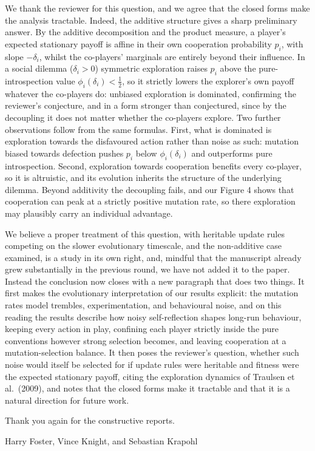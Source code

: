 \documentclass[11pt]{article}
\begin{document}
We thank the reviewer for this question, and we agree that the closed
forms make the analysis tractable. Indeed, the additive structure gives a
sharp preliminary answer. By the additive decomposition and the product
measure, a player's expected stationary payoff is affine in their own
cooperation probability \(p_i\), with slope \(-\delta_i\), whilst the
co-players' marginals are entirely beyond their influence. In a social
dilemma (\(\delta_i>0\)) symmetric exploration raises \(p_i\) above the
pure-introspection value \(\phi_i(\delta_i)<\tfrac{1}{2}\), so it
strictly lowers the explorer's own payoff whatever the co-players do:
unbiased exploration is dominated, confirming the reviewer's conjecture,
and in a form stronger than conjectured, since by the decoupling it does
not matter whether the co-players explore. Two further observations
follow from
the same formulas. First, what is dominated is exploration towards the
disfavoured action rather than noise as such: mutation biased towards
defection pushes \(p_i\) below \(\phi_i(\delta_i)\) and outperforms pure
introspection. Second, exploration towards cooperation benefits every
co-player, so it is altruistic, and its evolution inherits the structure
of the underlying dilemma. Beyond additivity the decoupling fails, and
our Figure 4 shows that cooperation can peak at a strictly positive
mutation rate, so there exploration may plausibly carry an individual
advantage.

We believe a proper treatment of this question, with heritable update
rules competing on the slower evolutionary timescale, and the
non-additive case examined, is a study in its own right, and, mindful
that the manuscript already grew substantially in the previous round, we
have not added it to the paper. Instead the conclusion now closes with a
new paragraph that does two things. It first makes the evolutionary
interpretation of our results explicit: the mutation rates model
trembles, experimentation, and behavioural noise, and on this reading
the results describe how noisy self-reflection shapes long-run
behaviour, keeping every action in play, confining each player strictly
inside the pure conventions however strong selection becomes, and
leaving cooperation at a mutation-selection balance. It then poses the
reviewer's question, whether such noise would itself be selected for if
update rules were heritable and fitness were the expected stationary
payoff, citing the exploration dynamics of Traulsen et al.\ (2009), and
notes that the closed forms make it tractable and that it is a natural
direction for future work.

\vspace{2em}

Thank you again for the constructive reports.

Harry Foster, Vince Knight, and Sebastian Krapohl
\end{document}
